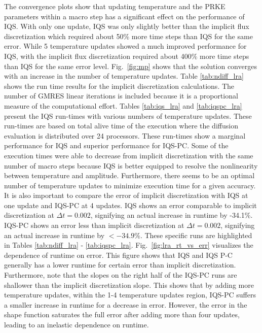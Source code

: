 \documentclass{elsarticle}
\newcommand{\fig}[1]{Fig.~\ref{#1}}                      %
\newcommand{\iqspc}{IQS-PC\xspace}
\begin{document}
The convergence plots show that updating temperature and the PRKE parameters within a macro step has a significant effect on the performance of IQS.  With only one update, IQS was only slightly better than the implicit flux discretization which required about 50\% more time steps than IQS for the same error.  While 5 temperature updates showed a much improved performance for IQS, with the implicit flux discretization required about 400\% more time steps than IQS for the same error level.  \fig{fig:mp} shows that the solution converges with an increase in the number of temperature updates. 
%
Table \ref{tab:ndiff_lra} shows the run time results for the implicit discretization calculations. The number of GMRES linear iterations is included because it is a proportional measure of the computational effort. Tables \ref{tab:iqs_lra} and \ref{tab:iqspc_lra} present the IQS run-times with various numbers of temperature updates.  These run-times are based on total alive time of the execution where the diffusion evaluation is distributed over 24 processors. These run-times show a marginal performance for IQS and superior performance for \iqspc.  Some of the execution times were able to decrease from implicit discretization with the same number of macro steps because IQS is better equipped to resolve the nonlinearity between temperature and amplitude. Furthermore, there seems to be an optimal number of temperature updates to minimize execution time for a given accuracy.
It is also important to compare the error of implicit discretization with IQS at one update and \iqspc at 4 updates.  IQS shows an error comparable to implicit discretization at $\Delta t = 0.002$, signifying an actual increase in runtime by -34.1\%.  \iqspc shows an error less than implicit discretization at $\Delta t = 0.002$, signifying an actual increase in runtime by $<-34.9\%$. These specific runs are highlighted in Tables \ref{tab:ndiff_lra} - \ref{tab:iqspc_lra}.
\fig{fig:lra_rt_vs_err} visualizes the dependence of runtime on error. This figure shows that IQS and IQS P-C generally has a lower runtime for certain error than implicit discretization. Furthermore, note that the slopes on the right half of the \iqspc runs are shallower than the implicit discretization slope. This shows that by adding more temperature updates, within the 1-4 temperature updates region, \iqspc suffers a smaller increase in runtime for a decrease in error. However, the error in the shape function saturates the full error after adding more than four updates, leading to an inelastic dependence on runtime. 
\end{document}
